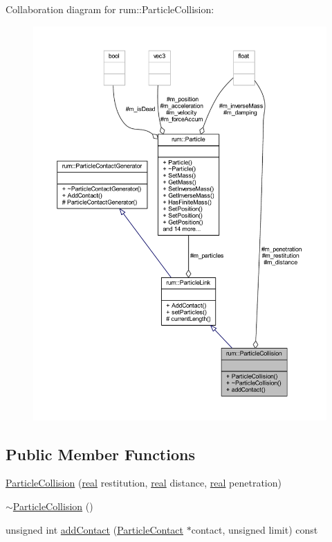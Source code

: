 Collaboration diagram for rum\+:\+:Particle\+Collision\+:\nopagebreak
\begin{figure}[H]
\begin{center}
\leavevmode
\includegraphics[width=350pt]{classrum_1_1_particle_collision__coll__graph}
\end{center}
\end{figure}
\subsection*{Public Member Functions}
\begin{DoxyCompactItemize}
\item 
\hyperlink{classrum_1_1_particle_collision_a56570896eab4c089fd3df8fa6e96454c}{Particle\+Collision} (\hyperlink{namespacerum_a7e8cca23573d5eaead0f138cbaa4862c}{real} restitution, \hyperlink{namespacerum_a7e8cca23573d5eaead0f138cbaa4862c}{real} distance, \hyperlink{namespacerum_a7e8cca23573d5eaead0f138cbaa4862c}{real} penetration)
\item 
\hyperlink{classrum_1_1_particle_collision_afad930c6a0755e28c2bbca80cc7b5759}{$\sim$\+Particle\+Collision} ()
\item 
unsigned int \hyperlink{classrum_1_1_particle_collision_ad2f5fd21d9acf412ebf915df4495c159}{add\+Contact} (\hyperlink{classrum_1_1_particle_contact}{Particle\+Contact} $\ast$contact, unsigned limit) const
\end{DoxyCompactItemize}
